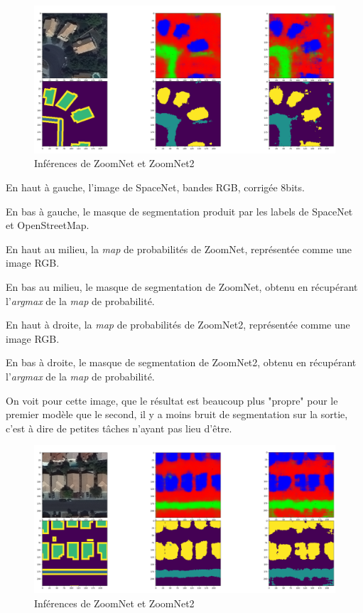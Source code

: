 \documentclass[a4paper, 11pt]{report}
\begin{document}
\begin{figure}[H]
	\centering
	\includegraphics[scale=0.225]{Images/ZoomNets_1983.png}
	\caption{Inférences de ZoomNet et ZoomNet2}
\end{figure}

En haut à gauche, l'image de SpaceNet, bandes RGB, corrigée 8bits.

En bas à gauche, le masque de segmentation produit par les labels de SpaceNet et OpenStreetMap.

En haut au milieu, la \emph{map} de probabilités de ZoomNet, représentée comme une image RGB.

En bas au milieu, le masque de segmentation de ZoomNet, obtenu en récupérant l'\emph{argmax} de la \emph{map} de probabilité.

En haut à droite, la \emph{map} de probabilités de ZoomNet2, représentée comme une image RGB.

En bas à droite, le masque de segmentation de ZoomNet2, obtenu en récupérant l'\emph{argmax} de la \emph{map} de probabilité.

On voit pour cette image, que le résultat est beaucoup plus "propre" pour le premier modèle que le second, il y a moins bruit de segmentation sur la sortie, c'est à dire de petites tâches n'ayant pas lieu d'être.

\begin{figure}[H]
	\centering
	\includegraphics[scale=0.225]{Images/ZoomNets_5000.png}
	\caption{Inférences de ZoomNet et ZoomNet2}
\end{figure}
\end{document}
